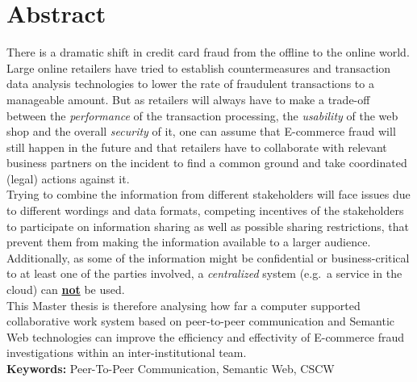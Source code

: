 
\chapter*{Abstract}

There is a dramatic shift in credit card fraud from the offline to the online world. Large online retailers have tried to establish countermeasures and transaction data analysis technologies to lower the rate of fraudulent transactions to a manageable amount. But as retailers will always have to make a trade-off between the \textit{performance} of the transaction processing, the \textit{usability} of the web shop and the overall \textit{security} of it, one can assume that \gls{E-commerce} fraud will still happen in the future and that retailers have to collaborate with relevant business partners on the incident to find a common ground and take coordinated (legal) actions against it. \\

Trying to combine the information from different stakeholders will face issues due to different wordings and data formats, competing incentives of the stakeholders to participate on information sharing as well as possible sharing restrictions, that prevent them from making the information available to a larger audience. Additionally, as some of the information might be confidential or business-critical to at least one of the parties involved, a \textit{centralized} system (e.g.\ a service in the cloud) can \textbf{\underline{not}} be used. \\

This Master thesis is therefore analysing how far a computer supported collaborative work system based on peer-to-peer communication and Semantic Web technologies can improve the efficiency and effectivity of \gls{E-commerce} fraud investigations within an inter-institutional team. \\[2em]

\textbf{Keywords:} Peer-To-Peer Communication, Semantic Web, CSCW
